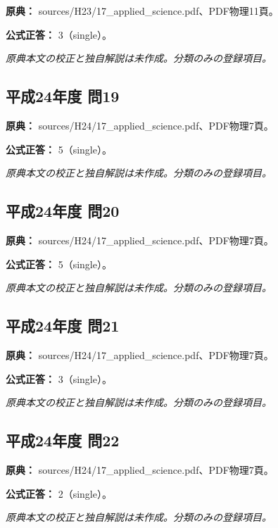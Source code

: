 \noindent\textbf{原典：} sources/H23/17\_applied\_science.pdf、PDF物理11頁。

\textbf{公式正答：} 3（single）。

\par\textit{原典本文の校正と独自解説は未作成。分類のみの登録項目。}

\subsection{平成24年度 問19}
\label{q:h24-reg-applied-19}

\noindent\textbf{原典：} sources/H24/17\_applied\_science.pdf、PDF物理7頁。

\textbf{公式正答：} 5（single）。

\par\textit{原典本文の校正と独自解説は未作成。分類のみの登録項目。}

\subsection{平成24年度 問20}
\label{q:h24-reg-applied-20}

\noindent\textbf{原典：} sources/H24/17\_applied\_science.pdf、PDF物理7頁。

\textbf{公式正答：} 5（single）。

\par\textit{原典本文の校正と独自解説は未作成。分類のみの登録項目。}

\subsection{平成24年度 問21}
\label{q:h24-reg-applied-21}

\noindent\textbf{原典：} sources/H24/17\_applied\_science.pdf、PDF物理7頁。

\textbf{公式正答：} 3（single）。

\par\textit{原典本文の校正と独自解説は未作成。分類のみの登録項目。}

\subsection{平成24年度 問22}
\label{q:h24-reg-applied-22}

\noindent\textbf{原典：} sources/H24/17\_applied\_science.pdf、PDF物理7頁。

\textbf{公式正答：} 2（single）。

\par\textit{原典本文の校正と独自解説は未作成。分類のみの登録項目。}


